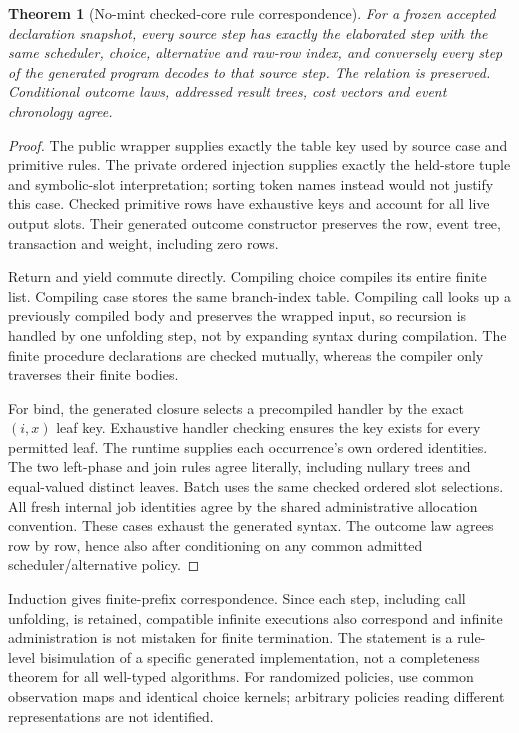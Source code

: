 \documentclass[11pt]{article}
\newtheorem{theorem}{Theorem}
\begin{document}
\begin{theorem}[No-mint checked-core rule correspondence]
For a frozen accepted declaration snapshot, every source step has exactly the elaborated step with the same scheduler, choice, alternative and raw-row index, and conversely every step of the generated program decodes to that source step. The relation is preserved. Conditional outcome laws, addressed result trees, cost vectors and event chronology agree.
\end{theorem}
\begin{proof}
The public wrapper supplies exactly the table key used by source case and primitive rules. The private ordered injection supplies exactly the held-store tuple and symbolic-slot interpretation; sorting token names instead would not justify this case. Checked primitive rows have exhaustive keys and account for all live output slots. Their generated outcome constructor preserves the row, event tree, transaction and weight, including zero rows.

Return and yield commute directly. Compiling choice compiles its entire finite list. Compiling case stores the same branch-index table. Compiling call looks up a previously compiled body and preserves the wrapped input, so recursion is handled by one unfolding step, not by expanding syntax during compilation. The finite procedure declarations are checked mutually, whereas the compiler only traverses their finite bodies.

For bind, the generated closure selects a precompiled handler by the exact $(i,x)$ leaf key. Exhaustive handler checking ensures the key exists for every permitted leaf. The runtime supplies each occurrence's own ordered identities. The two left-phase and join rules agree literally, including nullary trees and equal-valued distinct leaves. Batch uses the same checked ordered slot selections. All fresh internal job identities agree by the shared administrative allocation convention. These cases exhaust the generated syntax. The outcome law agrees row by row, hence also after conditioning on any common admitted scheduler/alternative policy.
\end{proof}

Induction gives finite-prefix correspondence. Since each step, including call unfolding, is retained, compatible infinite executions also correspond and infinite administration is not mistaken for finite termination. The statement is a rule-level bisimulation of a specific generated implementation, not a completeness theorem for all well-typed algorithms. For randomized policies, use common observation maps and identical choice kernels; arbitrary policies reading different representations are not identified.
\end{document}
